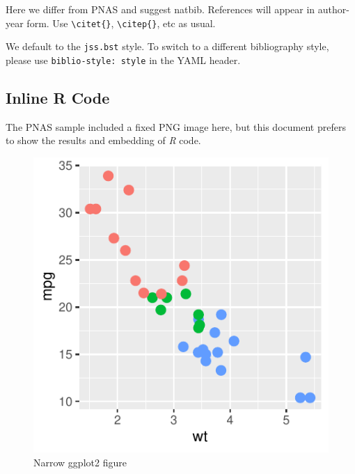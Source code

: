 \documentclass[letterpaper,9pt,twocolumn,twoside,]{pinp}
\begin{document}
Here we differ from PNAS and suggest natbib. References will appear in
author-year form. Use \texttt{\textbackslash{}citet\{\}},
\texttt{\textbackslash{}citep\{\}}, etc as usual.

We default to the \texttt{jss.bst} style. To switch to a different
bibliography style, please use \texttt{biblio-style:\ style} in the YAML
header.

\hypertarget{inline-r-code}{%
\subsection{Inline R Code}\label{inline-r-code}}

The PNAS sample included a fixed PNG image here, but this document
prefers to show the results and embedding of \emph{R} code.

\begin{Shaded}
\begin{Highlighting}[]
\SpecialCharTok{+}
    \NormalTok{(}\NormalTok{, }\NormalTok{(}\SpecialCharTok{+}
    \NormalTok{(}\NormalTok{)}
\end{Highlighting}
\end{Shaded}

\begin{figure}

{\centering \includegraphics{pinpTemplate_files/figure-latex/figex-1} 

}

\caption{Narrow ggplot2 figure}\label{fig:figex}
\end{figure}
\end{document}
